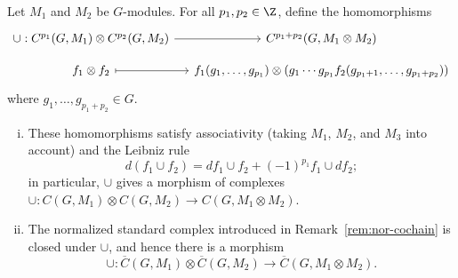 \begin{definition-proposition}\label{def:group-cup-3}
	Let $M_1$ and $M_2$ be $G$-modules. For all $p_1,p_2\in\Z$, define the
	homomorphisms
	\[\begin{tikzcd}[row sep=small, column sep=small]
		\cup: C^{p_1}(G, M_1) \otimes C^{p_2}(G, M_2) \arrow[r] & C^{p_1 + p_2}(G, M_1 \otimes M_2) \\
		f_1 \otimes f_2 \arrow[mapsto, r] & f_1(g_1, \ldots, g_{p_1}) \otimes (g_1 \cdots g_{p_1} f_2(g_{p_1 + 1}, \ldots, g_{p_1 + p_2}))
	\end{tikzcd}\]
	where $g_1,\ldots,g_{p_1+p_2}\in G$.
	\begin{enumerate}[(i)]
		\item These homomorphisms satisfy associativity (taking $M_1$, $M_2$,
		and $M_3$ into account) and the Leibniz rule
		\[ d(f_1 \cup f_2) = df_1 \cup f_2 + (-1)^{p_1} f_1 \cup d f_2; \]
		in particular, $\cup$ gives a morphism of complexes
		$\cup:C(G,M_1)\otimes C(G,M_2)\to C(G,M_1\otimes M_2)$.
		\item The normalized standard complex introduced in
		Remark~\ref{rem:nor-cochain} is closed under $\cup$, and hence there is
		a morphism
		\[ \cup: \overline{C}(G, M_1) \otimes \overline{C}(G, M_2) \to \overline{C}(G, M_1 \otimes M_2). \]
	\end{enumerate}
\end{definition-proposition}

